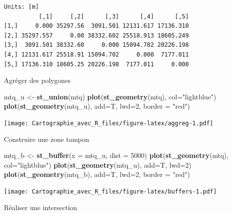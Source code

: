 \documentclass[]{book}
\newenvironment{Shaded}{\begin{snugshade}}{\end{snugshade}}
\newcommand{\DataTypeTok}[1]{\textcolor[rgb]{0.13,0.29,0.53}{#1}}
\newcommand{\DecValTok}[1]{\textcolor[rgb]{0.00,0.00,0.81}{#1}}
\newcommand{\KeywordTok}[1]{\textcolor[rgb]{0.13,0.29,0.53}{\textbf{#1}}}
\newcommand{\NormalTok}[1]{#1}
\newcommand{\StringTok}[1]{\textcolor[rgb]{0.31,0.60,0.02}{#1}}
\begin{document}
\begin{verbatim}
Units: [m]
          [,1]     [,2]      [,3]      [,4]      [,5]
[1,]     0.000 35297.56  3091.501 12131.617 17136.310
[2,] 35297.557     0.00 38332.602 25518.913 18605.249
[3,]  3091.501 38332.60     0.000 15094.702 20226.198
[4,] 12131.617 25518.91 15094.702     0.000  7177.011
[5,] 17136.310 18605.25 20226.198  7177.011     0.000
\end{verbatim}

Agréger des polygones

\begin{Shaded}
\begin{Highlighting}[]
\NormalTok{mtq_u <-}\StringTok{ }\KeywordTok{st_union}\NormalTok{(mtq)}
\KeywordTok{plot}\NormalTok{(}\KeywordTok{st_geometry}\NormalTok{(mtq), }\DataTypeTok{col=}\StringTok{"lightblue"}\NormalTok{)}
\KeywordTok{plot}\NormalTok{(}\KeywordTok{st_geometry}\NormalTok{(mtq_u), }\DataTypeTok{add=}\NormalTok{T, }\DataTypeTok{lwd=}\DecValTok{2}\NormalTok{, }\DataTypeTok{border =} \StringTok{"red"}\NormalTok{)}
\end{Highlighting}
\end{Shaded}

\texttt{[image: Cartographie\_avec\_R\_files/figure-latex/aggreg-1.pdf]}

Construire une zone tampon

\begin{Shaded}
\begin{Highlighting}[]
\NormalTok{mtq_b <-}\StringTok{ }\KeywordTok{st_buffer}\NormalTok{(}\DataTypeTok{x =}\NormalTok{ mtq_u, }\DataTypeTok{dist =} \DecValTok{5000}\NormalTok{)}
\KeywordTok{plot}\NormalTok{(}\KeywordTok{st_geometry}\NormalTok{(mtq), }\DataTypeTok{col=}\StringTok{"lightblue"}\NormalTok{)}
\KeywordTok{plot}\NormalTok{(}\KeywordTok{st_geometry}\NormalTok{(mtq_u), }\DataTypeTok{add=}\NormalTok{T, }\DataTypeTok{lwd=}\DecValTok{2}\NormalTok{)}
\KeywordTok{plot}\NormalTok{(}\KeywordTok{st_geometry}\NormalTok{(mtq_b), }\DataTypeTok{add=}\NormalTok{T, }\DataTypeTok{lwd=}\DecValTok{2}\NormalTok{, }\DataTypeTok{border =} \StringTok{"red"}\NormalTok{)}
\end{Highlighting}
\end{Shaded}

\texttt{[image: Cartographie\_avec\_R\_files/figure-latex/buffers-1.pdf]}

Réaliser une intersection
\end{document}
